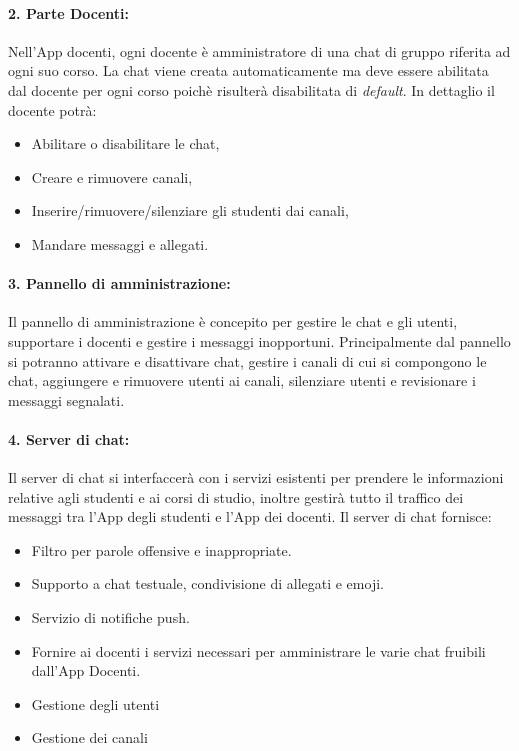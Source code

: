 \paragraph{2. Parte Docenti:\newline}
Nell’App docenti, ogni docente è amministratore di una chat di gruppo riferita ad ogni suo corso. La chat viene creata automaticamente ma deve essere abilitata dal docente per ogni corso poichè risulterà disabilitata di \textit{default}.\newline
In dettaglio il docente potrà:
\begin{itemize}
\item Abilitare o disabilitare le chat, 
\item Creare e rimuovere canali, 
\item Inserire/rimuovere/silenziare gli studenti dai canali,
\item Mandare messaggi e allegati.
\end{itemize} 

\paragraph{3. Pannello di amministrazione:\newline}
Il pannello di amministrazione è concepito per gestire le chat e gli utenti, supportare i docenti e gestire i messaggi inopportuni. Principalmente dal pannello si potranno attivare e disattivare chat, gestire i canali di cui si compongono le chat, aggiungere e rimuovere utenti ai canali, silenziare utenti e revisionare i messaggi segnalati.

\paragraph{4. Server di chat:\newline}
Il server di chat si interfaccerà con i servizi esistenti per prendere le informazioni relative agli studenti e ai corsi di studio, inoltre gestirà tutto il traffico dei messaggi tra l'App degli studenti e l'App dei docenti.\newline
Il server di chat fornisce:
\begin{itemize}
\item Filtro per parole offensive e inappropriate.
\item Supporto a chat testuale, condivisione di allegati e emoji.
\item Servizio di notifiche push.
\item Fornire ai docenti i servizi necessari per amministrare le varie chat fruibili dall’App Docenti.
\item Gestione degli utenti
\item Gestione dei canali
\end{itemize}

